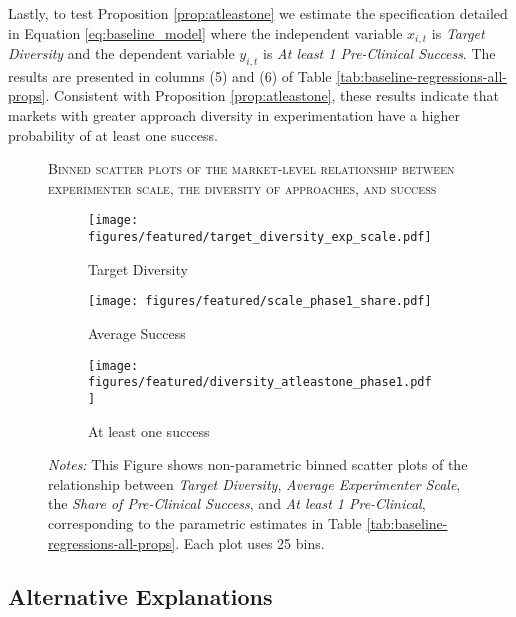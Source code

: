 Lastly, to test Proposition \ref{prop:atleastone} we estimate the specification detailed in Equation \ref{eq:baseline_model} where the independent variable $x_{i, t}$ is \emph{Target Diversity} and the dependent variable $y_{i, t}$ is \emph{At least 1 Pre-Clinical Success}. The results are presented in columns (5) and (6) of Table \ref{tab:baseline-regressions-all-props}. Consistent with Proposition \ref{prop:atleastone}, these results indicate that markets with greater approach diversity in experimentation have a higher probability of at least one success. 


\begin{figure}[h!]
\caption{\textsc{Binned scatter plots of the market-level relationship between experimenter scale, the diversity of approaches, and success}}
\label{fig:baseline-nonparametrics}
    \centering
    \begin{subfigure}[t]{.3\textwidth}
        \centering
        \caption{Target Diversity}
        \texttt{[image: figures/featured/target\_diversity\_exp\_scale.pdf]}
    \end{subfigure}
    \begin{subfigure}[t]{.3\textwidth}
        \centering
        \caption{Average Success}
        \texttt{[image: figures/featured/scale\_phase1\_share.pdf]}
    \end{subfigure}
        \begin{subfigure}[t]{.3\textwidth}
        \centering
        \caption{At least one success}
        \texttt{[image: figures/featured/diversity\_atleastone\_phase1.pdf]}
    \end{subfigure}
\caption*{\scriptsize\emph{Notes:} This Figure shows non-parametric binned scatter plots of the relationship between \emph{Target Diversity}, \emph{Average Experimenter Scale}, the \emph{Share of Pre-Clinical Success}, and \emph{At least 1 Pre-Clinical}, corresponding to the parametric estimates in Table \ref{tab:baseline-regressions-all-props}. Each plot uses 25 bins. }
\end{figure}

\subsection{Alternative Explanations}

